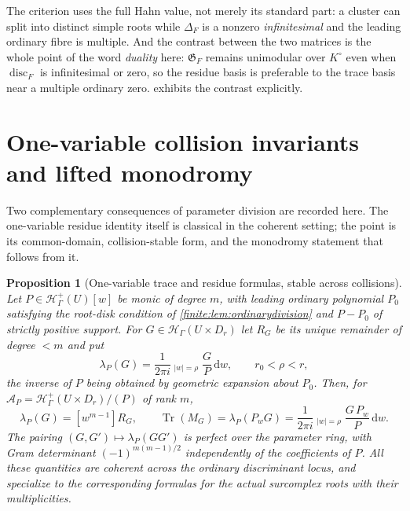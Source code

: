 \documentclass[11pt,letterpaper]{article}
\newtheorem{proposition}[theorem]{Proposition}
\theoremstyle{definition}
\theoremstyle{remark}
\newcommand{\HH}{\mathscr H}
\newcommand{\Hp}{\mathscr H^{+}}
\newcommand{\Alg}{\mathcal A}
\newcommand{\Kc}{K^{\circ}}
\newcommand{\dd}{\mathrm d}
\newcommand{\Gram}{\mathfrak G}
\newcommand{\Hoint}{\mathop{\oint^{\,H}}\nolimits}
\DeclareMathOperator{\Tr}{Tr}
\DeclareMathOperator{\disc}{disc}
\numberwithin{equation}{section}
\begin{document}
The criterion uses the full Hahn value, not merely its standard part: a cluster can split into distinct simple roots while $\Delta_F$ is a nonzero \emph{infinitesimal} and the leading ordinary fibre is multiple. And the contrast between the two matrices is the whole point of the word \emph{duality} here: $\Gram_F$ remains unimodular over $\Kc$ even when $\disc_F$ is infinitesimal or zero, so the residue basis is preferable to the trace basis near a multiple ordinary zero.  exhibits the contrast explicitly.

\section{One-variable collision invariants and lifted monodromy}
\label{finite:sec:onevar}

Two complementary consequences of parameter division are recorded here. The one-variable residue identity itself is classical in the coherent setting; the point is its common-domain, collision-stable form, and the monodromy statement that follows from it.

\begin{proposition}[One-variable trace and residue formulas, stable across collisions]
\label{finite:prop:univtrace}
Let $P\in\Hp_\Gamma(U)[w]$ be monic of degree $m$, with leading ordinary polynomial $P_0$ satisfying the root-disk condition of \cref{finite:lem:ordinarydivision} and $P-P_0$ of strictly positive support. For $G\in\HH_\Gamma(U\times D_r)$ let $R_G$ be its unique remainder of degree $<m$ and put
\[
 \lambda_P(G)=\frac1{2\pi i}\Hoint_{|w|=\rho}\frac{G}{P}\,\dd w,
 \qquad r_0<\rho<r,
\]
the inverse of $P$ being obtained by geometric expansion about $P_0$. Then, for $\Alg_P=\Hp_\Gamma(U\times D_r)/(P)$ of rank $m$,
\begin{equation}\label{finite:eq:univresidue}
 \lambda_P(G)=[w^{m-1}]R_G,
 \qquad
 \Tr(M_G)=\lambda_P(P_wG)
 =\frac1{2\pi i}\Hoint_{|w|=\rho}\frac{G\,P_w}{P}\,\dd w .
\end{equation}
The pairing $(G,G')\mapsto\lambda_P(GG')$ is perfect over the parameter ring, with Gram determinant $(-1)^{m(m-1)/2}$ independently of the coefficients of $P$. All these quantities are coherent \emph{across} the ordinary discriminant locus, and specialize to the corresponding formulas for the actual surcomplex roots with their multiplicities.
\end{proposition}
\end{document}

